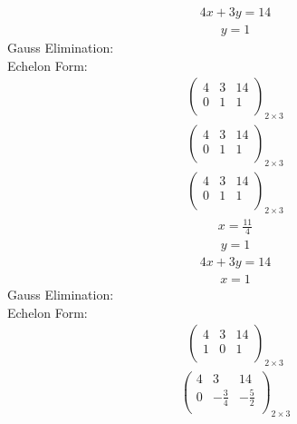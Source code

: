 \documentclass{article}
\begin{document}
\begin{align*}
4x + 3y=14\end{align*}
\begin{align*}
y=1\end{align*}
Gauss Elimination:\\
Echelon Form:\\
\begin{align*}
\left(
\begin{array}{cc|c}
4 & 3 & 14\\
0 & 1 & 1\\
\end{array}
\right)_{2\times 3}
\end{align*}
\begin{align*}
\left(
\begin{array}{cc|c}
4 & 3 & 14\\
0 & 1 & 1\\
\end{array}
\right)_{2\times 3}
\end{align*}
\begin{align*}
\left(
\begin{array}{cc|c}
4 & 3 & 14\\
0 & 1 & 1\\
\end{array}
\right)_{2\times 3}
\end{align*}
\begin{align*}
x=\frac{11}{4}\end{align*}
\begin{align*}
y=1\end{align*}
\begin{align*}
4x + 3y=14\end{align*}
\begin{align*}
x=1\end{align*}
Gauss Elimination:\\
Echelon Form:\\
\begin{align*}
\left(
\begin{array}{cc|c}
4 & 3 & 14\\
1 & 0 & 1\\
\end{array}
\right)_{2\times 3}
\end{align*}
\begin{align*}
\left(
\begin{array}{cc|c}
4 & 3 & 14\\
0 & -\frac{3}{4} & -\frac{5}{2}\\
\end{array}
\right)_{2\times 3}
\end{align*}
\end{document}
